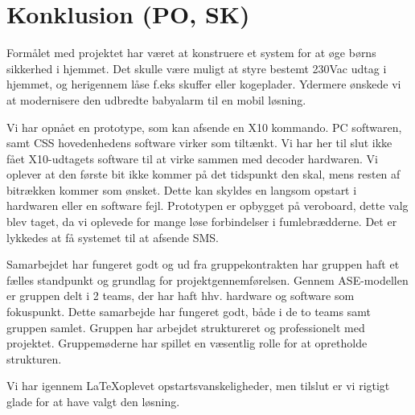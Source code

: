 \chapter{Konklusion (PO, SK)}

Formålet med projektet har været at konstruere et system for at øge børns sikkerhed i hjemmet. Det skulle være muligt at styre bestemt 230Vac udtag i hjemmet, og herigennem låse f.eks skuffer eller kogeplader. Ydermere ønskede vi at modernisere den udbredte babyalarm til en mobil løsning. 

Vi har opnået en prototype, som kan afsende en X10 kommando. PC softwaren, samt CSS hovedenhedens software virker som tiltænkt. Vi har her til slut ikke fået X10-udtagets software til at virke sammen med decoder hardwaren. Vi oplever at den første bit ikke kommer på det tidspunkt den skal, mens resten af bitrækken kommer som ønsket. Dette kan skyldes en langsom opstart i hardwaren eller en software fejl. Prototypen er opbygget på veroboard, dette valg blev taget, da vi oplevede for mange løse forbindelser i fumlebrædderne. 
Det er lykkedes at få systemet til at afsende SMS.  

Samarbejdet har fungeret godt og ud fra gruppekontrakten har gruppen haft et fælles standpunkt og grundlag for projektgennemførelsen. Gennem ASE-modellen er gruppen delt i 2 teams, der har haft hhv. hardware og software som fokuspunkt. Dette samarbejde har fungeret godt, både i de to teams samt gruppen samlet. Gruppen har arbejdet struktureret og professionelt med projektet. Gruppemøderne har spillet en væsentlig rolle for at opretholde strukturen.  

Vi har igennem \LaTeX  oplevet opstartsvanskeligheder, men tilslut er vi rigtigt glade for at have valgt den løsning. 